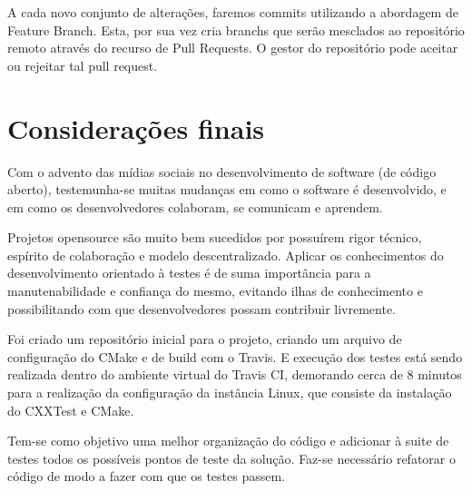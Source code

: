 \documentclass[
	article,			%
	12pt,				%
	oneside,			%
	a4paper,			%
	english,			
	brazil,
	sumario=tradicional
	]{abntex2}
\begin{document}
A cada novo conjunto de alterações, faremos commits utilizando a abordagem de Feature Branch. Esta, por sua vez cria branchs que serão mesclados ao repositório remoto através do recurso de Pull Requests. O gestor do repositório pode aceitar ou rejeitar tal pull request.




% 

\pagebreak
\section*{Considerações finais}
Com o advento das mídias sociais no desenvolvimento de software (de código aberto), testemunha-se muitas mudanças em como o software é desenvolvido, e em como os desenvolvedores colaboram, se comunicam e aprendem.

Projetos opensource são muito bem sucedidos por possuírem rigor técnico, espírito de colaboração e modelo descentralizado. Aplicar os conhecimentos do desenvolvimento orientado à testes é de suma importância para a manutenabilidade e confiança do mesmo, evitando ilhas de conhecimento e possibilitando com que desenvolvedores possam contribuir livremente.

Foi criado um repositório inicial para o projeto, criando um arquivo de configuração do CMake e de build com o Travis. E execução dos testes está sendo realizada dentro do ambiente virtual do Travis CI, demorando cerca de 8 minutos para a realização da configuração da instância Linux, que consiste da instalação do CXXTest e CMake.

Tem-se como objetivo uma melhor organização do código e adicionar à suite de testes todos os possíveis pontos de teste da solução. Faz-se necessário refatorar o código de modo a fazer com que os testes passem. 
\end{document}

